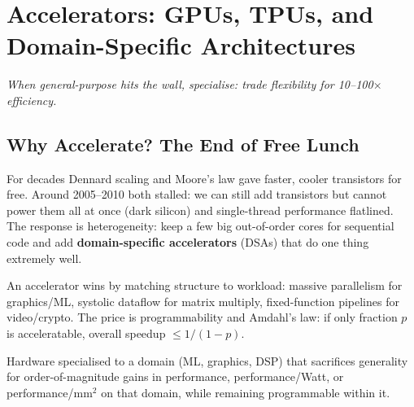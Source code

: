 \chapter{Accelerators: GPUs, TPUs, and Domain-Specific Architectures}\label{ch:accelerators}
\begin{center}\small\textit{When general-purpose hits the wall, specialise: trade flexibility for 10--100$\times$ efficiency.}\end{center}

\section{Why Accelerate? The End of Free Lunch}
For decades Dennard scaling and Moore's law gave faster, cooler transistors for free.
Around 2005--2010 both stalled: we can still add transistors but cannot power them all
at once (dark silicon) and single-thread performance flatlined. The response is
heterogeneity: keep a few big out-of-order cores for sequential code and add
\textbf{domain-specific accelerators} (DSAs) that do one thing extremely well.

An accelerator wins by matching structure to workload: massive parallelism for
graphics/ML, systolic dataflow for matrix multiply, fixed-function pipelines for
video/crypto. The price is programmability and Amdahl's law: if only fraction $p$ is
acceleratable, overall speedup $\le 1/(1-p)$.

\begin{definition}
Hardware specialised to a domain (ML, graphics, DSP) that sacrifices generality for
order-of-magnitude gains in performance, performance/Watt, or performance/mm$^2$ on that
domain, while remaining programmable within it.
\end{definition}


